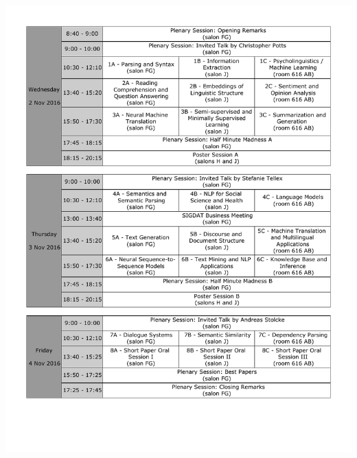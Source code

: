 \normalsize

\clearpage{}
\pagestyle{fancy}

\begin{center}
\includegraphics[width=1.0\textwidth, height=0.9\textheight]{content/overview-mainConf-v1.pdf}
\par\end{center}

\clearpage{}

\small

%
%
%
%

